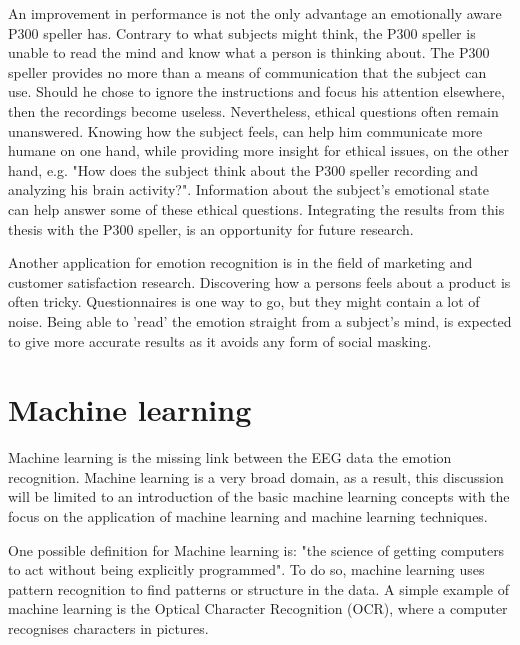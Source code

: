\npar

An improvement in performance is not the only advantage an emotionally aware P300 speller has. Contrary to what subjects might think, the P300 speller is unable to read the mind and know what a person is thinking about\cite{P300Origin}. The P300 speller provides no more than a means of communication that the subject can use. Should he chose to ignore the instructions and focus his attention elsewhere, then the recordings become useless. Nevertheless, ethical questions often remain unanswered. Knowing how the subject feels, can help him communicate more humane on one hand, while providing more insight for ethical issues, on the other hand, e.g. "How does the subject think about the P300 speller recording and analyzing his brain activity?". Information about the subject's emotional state can help answer some of these ethical questions. Integrating the results from this thesis with the P300 speller, is an opportunity for future research.

\npar

Another application for emotion recognition is in the field of marketing and customer satisfaction research. Discovering how a persons feels about a product is often tricky. Questionnaires is one way to go, but they might contain a lot of noise. Being able to 'read' the emotion straight from a subject's mind, is expected to give more accurate results as it avoids any form of social masking.

\section{Machine learning}
Machine learning is the missing link between the EEG data the emotion recognition. Machine learning is a very broad domain, as a result, this discussion will be limited to an introduction of the basic machine learning concepts with the focus on the application of machine learning and machine learning techniques. 

\npar

One possible definition for Machine learning is: "the science of getting computers to act without being explicitly programmed". To do so, machine learning uses pattern recognition to find patterns or structure in the data. A simple example of machine learning is the Optical Character Recognition (OCR), where a computer recognises characters in pictures.

\npar


